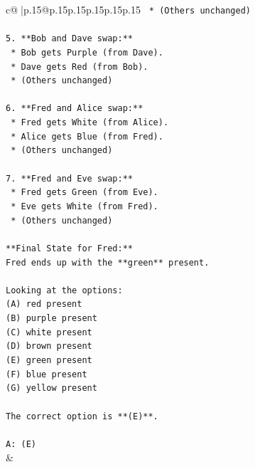 \documentclass{article}
\begin{document}
{\begin{supertabular}{c@{$\;$}|p{.15\linewidth}@{}p{.15\linewidth}p{.15\linewidth}p{.15\linewidth}p{.15\linewidth}p{.15\linewidth}}
{{{\texttt{    *   (Others unchanged)} \\
\\ 
\texttt{5.  **Bob and Dave swap:**} \\
\texttt{    *   Bob gets Purple (from Dave).} \\
\texttt{    *   Dave gets Red (from Bob).} \\
\texttt{    *   (Others unchanged)} \\
\\ 
\texttt{6.  **Fred and Alice swap:**} \\
\texttt{    *   Fred gets White (from Alice).} \\
\texttt{    *   Alice gets Blue (from Fred).} \\
\texttt{    *   (Others unchanged)} \\
\\ 
\texttt{7.  **Fred and Eve swap:**} \\
\texttt{    *   Fred gets Green (from Eve).} \\
\texttt{    *   Eve gets White (from Fred).} \\
\texttt{    *   (Others unchanged)} \\
\\ 
\texttt{**Final State for Fred:**} \\
\texttt{Fred ends up with the **green** present.} \\
\\ 
\texttt{Looking at the options:} \\
\texttt{(A) red present} \\
\texttt{(B) purple present} \\
\texttt{(C) white present} \\
\texttt{(D) brown present} \\
\texttt{(E) green present} \\
\texttt{(F) blue present} \\
\texttt{(G) yellow present} \\
\\ 
\texttt{The correct option is **(E)**.} \\
\\ 
\texttt{A: (E)} \\
            }
        }
    }
    & \\ \\


\end{supertabular}}
\end{document}
